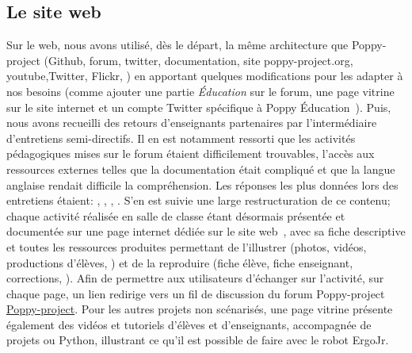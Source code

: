     \subsection{Le site web}
        Sur le web, nous avons utilisé, dès le départ, la même architecture que Poppy-project (Github, forum, twitter, documentation, site poppy-project.org, youtube,Twitter, Flickr, \etc) en apportant quelques modifications pour les adapter à nos besoins (comme ajouter une partie \textit{Éducation} sur le forum, une page vitrine sur le site internet et un compte Twitter spécifique à Poppy Éducation~). Puis, nous avons recueilli des retours d'enseignants partenaires par l'intermédiaire d'entretiens semi-directifs. Il en est notamment ressorti que les activités pédagogiques mises sur le forum étaient difficilement trouvables, l'accès aux ressources externes telles que la documentation était compliqué et que la langue anglaise rendait difficile la compréhension. Les réponses les plus données lors des entretiens étaient: , , , .
        S'en est suivie une large restructuration de ce contenu; chaque activité réalisée en salle de classe étant désormais présentée et documentée sur une page internet dédiée sur le site web~, avec sa fiche descriptive et toutes les ressources produites permettant de l'illustrer (photos, vidéos, productions d'élèves, \etc) et de la reproduire (fiche élève, fiche enseignant, corrections, \etc). Afin de permettre aux utilisateurs d'échanger sur l'activité, sur chaque page, un lien redirige vers un fil de discussion du forum Poppy-project \href{https://forum.poppy-project.org/c/Education/pedagogical-activities}{Poppy-project}.
        Pour les autres projets non scénarisés, une page vitrine  présente également des vidéos et tutoriels d'élèves et d'enseignants, accompagnée de projets  ou Python, illustrant ce qu'il est possible de faire avec le robot ErgoJr.
